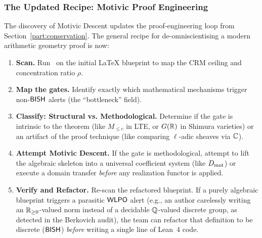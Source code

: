 \subsubsection{The Updated Recipe: Motivic Proof Engineering}\label{sec:recipe-updated}

The discovery of Motivic Descent updates the proof-engineering loop from Section~\ref{part:conservation}. The general recipe for de-omniscientising a modern arithmetic geometry proof is now:

\begin{enumerate}[label=\textbf{Step \arabic*.}]
\item \textbf{Scan.}
  Run \CRMlint\ on the initial LaTeX blueprint to map the CRM ceiling and concentration ratio $\rho$.
\item \textbf{Map the gates.}
  Identify exactly which mathematical mechanisms trigger non-$\textsf{BISH}$ alerts (the ``bottleneck'' field).
\item \textbf{Classify: Structural vs. Methodological.}
  Determine if the gate is intrinsic to the theorem (like $M_{\leq c}$ in LTE, or $G(\mathbb{R})$ in Shimura varieties) or an artifact of the proof technique (like comparing $\ell$-adic sheaves via $\mathbb{C}$).
\item \textbf{Attempt Motivic Descent.}
  If the gate is methodological, attempt to lift the algebraic skeleton into a universal coefficient system (like $D_{\mathrm{mot}}$) or execute a domain transfer \emph{before} any realization functor is applied.
\item \textbf{Verify and Refactor.}
  Re-scan the refactored blueprint. If a purely algebraic blueprint triggers a parasitic $\textsf{WLPO}$ alert (e.g., an author carelessly writing an $\mathbb{R}_{\geq 0}$-valued norm instead of a decidable $\mathbb{Q}$-valued discrete group, as detected in the Berkovich audit), the team can refactor that definition to be discrete ($\textsf{BISH}$) \emph{before} writing a single line of Lean~4 code.
\end{enumerate}

